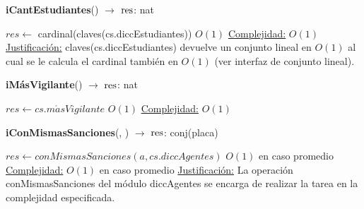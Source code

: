 \begin{Algoritmos}
\begin{algorithm}[H]{\textbf{iCantEstudiantes}() $\to$ $\res$: nat}
	\begin{algorithmic}
    \State $res \gets$ cardinal(claves(cs.diccEstudiantes)) \Comment $O(1)$
    \medskip
	\Statex \underline{Complejidad:} $O(1)$
    \Statex \underline{Justificaci\'on:} claves(cs.diccEstudiantes) devuelve un conjunto lineal en $O(1)$ al cual se le calcula el cardinal tambi\'en en $O(1)$ (ver interfaz de conjunto lineal).
	\end{algorithmic}
\end{algorithm}

\begin{algorithm}[H]{\textbf{iM\'asVigilante}() $\to$ $\res$: nat}
  \begin{algorithmic}
    \State $res \gets cs.m\acute{a}sVigilante$	\Comment $O(1)$
    \medskip
	\Statex \underline{Complejidad:} $O(1)$
  \end{algorithmic}
\end{algorithm}


\begin{algorithm}[H]{\textbf{iConMismasSanciones}(, ) $\to$ $\res$: conj(placa)}
  \begin{algorithmic}
    \State $res \gets conMismasSanciones(a,cs.diccAgentes)$	\Comment $O(1)$ en caso promedio
    \medskip
	\Statex \underline{Complejidad:} $O(1)$ en caso promedio
    \Statex \underline{Justificaci\'on:} La operaci\'on conMismasSanciones del m\'odulo diccAgentes se encarga de realizar la tarea en la complejidad especificada.
  \end{algorithmic}
\end{algorithm}



\end{Algoritmos}
